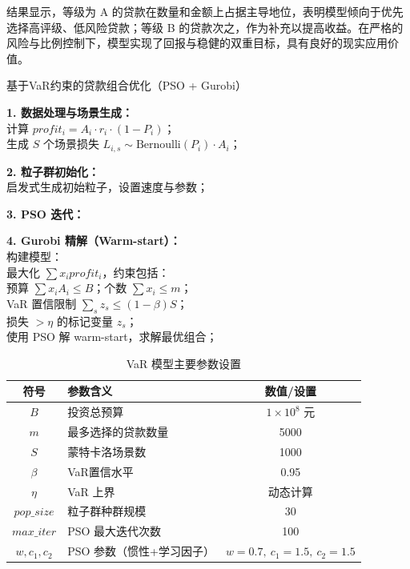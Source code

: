 \documentclass[12pt,nonblindrev]{write_paper}
\begin{document}
结果显示，等级为 A 的贷款在数量和金额上占据主导地位，表明模型倾向于优先选择高评级、低风险贷款；等级 B 的贷款次之，作为补充以提高收益。在严格的风险与比例控制下，模型实现了回报与稳健的双重目标，具有良好的现实应用价值。
\begin{algorithm}[htbp]
\caption{基于VaR约束的贷款组合优化（PSO + Gurobi）}

\textbf{1. 数据处理与场景生成：} \\
计算 $profit_i = A_i \cdot r_i \cdot (1 - P_i)$；\\
生成 $S$ 个场景损失 $L_{i,s} \sim \text{Bernoulli}(P_i) \cdot A_i$；

\textbf{2. 粒子群初始化：} \\
启发式生成初始粒子，设置速度与参数；

\textbf{3. PSO 迭代：} \\

\textbf{4. Gurobi 精解（Warm-start）：} \\
构建模型：\\
最大化 $\sum x_i profit_i$，约束包括：\\
\quad 预算 $\sum x_i A_i \le B$；个数 $\sum x_i \le m$；\\
\quad VaR 置信限制 $\sum_s z_s \le (1 - \beta) S$；\\
\quad 损失 $> \eta$ 的标记变量 $z_s$；\\
使用 PSO 解 warm-start，求解最优组合；
\end{algorithm}

\begin{table}[htbp]
\centering
\caption{VaR 模型主要参数设置}
\begin{tabular}{clc}
\toprule
符号 & 参数含义 & 数值/设置 \\
\midrule
$B$ & 投资总预算 & $1 \times 10^8$ 元 \\
$m$ & 最多选择的贷款数量 & 5000 \\
$S$ & 蒙特卡洛场景数 & 1000 \\
$\beta$ & VaR置信水平 & 0.95 \\
$\eta$ & VaR 上界 & 动态计算 \\
$pop\_size$ & 粒子群种群规模 & 30 \\
$max\_iter$ & PSO 最大迭代次数 & 100 \\
$w, c_1, c_2$ & PSO 参数（惯性+学习因子） & $w=0.7,\ c_1=1.5,\ c_2=1.5$ \\
\bottomrule
\end{tabular}
\label{tab:var-params}
\end{table}
\end{document}
